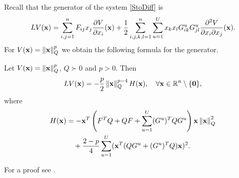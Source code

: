 \documentclass[a4paper,12pt,twoside,BCOR=10mm]{scrbook}
\begin{document}
Recall that the generator of the system \eqref{StoDiff} is
\begin{align*}
    LV(\mathbf{x}) = \sum\limits_{i,j = 1}^nF_{ij}x_j\frac{\partial V}{\partial x_i}(\mathbf{x}) + \frac{1}{2}\sum\limits_{i,j,k,l = 1}^n\sum\limits_{u = 1}^Ux_k x_l G_{ik}^u G_{jl}^u \frac{\partial^2 V}{\partial x_i \partial x_j}(\mathbf{x}).
\end{align*}
For $V(\mathbf{x}) = \left\lVert\mathbf{x}\right\rVert_Q^p$ we obtain the following formula for the generator.
\begin{lemma}\label{LemmaLVShorthand}
Let $V(\mathbf{x}) = \left\lVert\mathbf{x}\right\rVert_Q^p$, $Q \succ 0$ and $p > 0$. Then
\begin{align*}
    LV(\mathbf{x}) = -\frac{p}{2}\left\lVert\mathbf{x}\right\rVert_{Q}^{p - 4}H(\mathbf{x}), \quad \forall \mathbf{x} \in\mathbb{R}^{n}\setminus \{\mathbf{0}\},
\end{align*}
where
\begin{align}\label{H(x) definition}
\begin{split}
    H(\mathbf{x}) &= -\mathbf{x}^T \left(F^T Q + QF + \sum_{u = 1}^U (G^u)^TQG^u\right) \mathbf{x}\left\lVert\mathbf{x}\right\rVert_{Q}^{2}\\
    &\quad+ \frac{2 - p}{4} \sum_{u = 1}^U (\mathbf{x}^T (QG^u + (G^u)^TQ)\mathbf{x})^2.
\end{split}
\end{align}
\end{lemma}
For a proof see \citep[Lemma 12]{HGGS2018localLya}.
\end{document}
